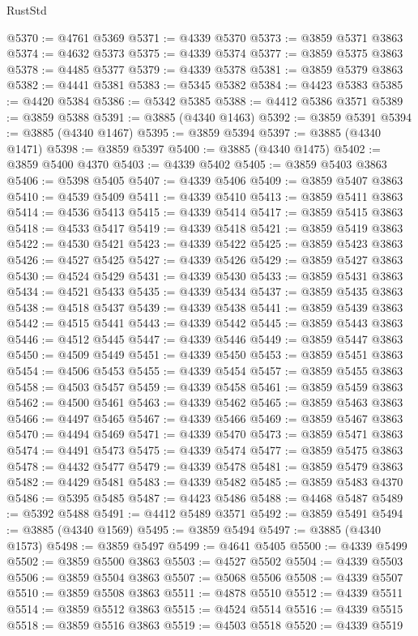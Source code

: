 \begin{lexlean}{RustStd}
\begin{coremodule}
@5370 := @4761 @5369
@5371 := @4339 @5370
@5373 := @3859 @5371 @3863
@5374 := @4632 @5373
@5375 := @4339 @5374
@5377 := @3859 @5375 @3863
@5378 := @4485 @5377
@5379 := @4339 @5378
@5381 := @3859 @5379 @3863
@5382 := @4441 @5381
@5383 := @5345 @5382
@5384 := @4423 @5383
@5385 := @4420 @5384
@5386 := @5342 @5385
@5388 := @4412 @5386 @3571
@5389 := @3859 @5388
@5391 := @3885 (@4340 @1463)
@5392 := @3859 @5391
@5394 := @3885 (@4340 @1467)
@5395 := @3859 @5394
@5397 := @3885 (@4340 @1471)
@5398 := @3859 @5397
@5400 := @3885 (@4340 @1475)
@5402 := @3859 @5400 @4370
@5403 := @4339 @5402
@5405 := @3859 @5403 @3863
@5406 := @5398 @5405
@5407 := @4339 @5406
@5409 := @3859 @5407 @3863
@5410 := @4539 @5409
@5411 := @4339 @5410
@5413 := @3859 @5411 @3863
@5414 := @4536 @5413
@5415 := @4339 @5414
@5417 := @3859 @5415 @3863
@5418 := @4533 @5417
@5419 := @4339 @5418
@5421 := @3859 @5419 @3863
@5422 := @4530 @5421
@5423 := @4339 @5422
@5425 := @3859 @5423 @3863
@5426 := @4527 @5425
@5427 := @4339 @5426
@5429 := @3859 @5427 @3863
@5430 := @4524 @5429
@5431 := @4339 @5430
@5433 := @3859 @5431 @3863
@5434 := @4521 @5433
@5435 := @4339 @5434
@5437 := @3859 @5435 @3863
@5438 := @4518 @5437
@5439 := @4339 @5438
@5441 := @3859 @5439 @3863
@5442 := @4515 @5441
@5443 := @4339 @5442
@5445 := @3859 @5443 @3863
@5446 := @4512 @5445
@5447 := @4339 @5446
@5449 := @3859 @5447 @3863
@5450 := @4509 @5449
@5451 := @4339 @5450
@5453 := @3859 @5451 @3863
@5454 := @4506 @5453
@5455 := @4339 @5454
@5457 := @3859 @5455 @3863
@5458 := @4503 @5457
@5459 := @4339 @5458
@5461 := @3859 @5459 @3863
@5462 := @4500 @5461
@5463 := @4339 @5462
@5465 := @3859 @5463 @3863
@5466 := @4497 @5465
@5467 := @4339 @5466
@5469 := @3859 @5467 @3863
@5470 := @4494 @5469
@5471 := @4339 @5470
@5473 := @3859 @5471 @3863
@5474 := @4491 @5473
@5475 := @4339 @5474
@5477 := @3859 @5475 @3863
@5478 := @4432 @5477
@5479 := @4339 @5478
@5481 := @3859 @5479 @3863
@5482 := @4429 @5481
@5483 := @4339 @5482
@5485 := @3859 @5483 @4370
@5486 := @5395 @5485
@5487 := @4423 @5486
@5488 := @4468 @5487
@5489 := @5392 @5488
@5491 := @4412 @5489 @3571
@5492 := @3859 @5491
@5494 := @3885 (@4340 @1569)
@5495 := @3859 @5494
@5497 := @3885 (@4340 @1573)
@5498 := @3859 @5497
@5499 := @4641 @5405
@5500 := @4339 @5499
@5502 := @3859 @5500 @3863
@5503 := @4527 @5502
@5504 := @4339 @5503
@5506 := @3859 @5504 @3863
@5507 := @5068 @5506
@5508 := @4339 @5507
@5510 := @3859 @5508 @3863
@5511 := @4878 @5510
@5512 := @4339 @5511
@5514 := @3859 @5512 @3863
@5515 := @4524 @5514
@5516 := @4339 @5515
@5518 := @3859 @5516 @3863
@5519 := @4503 @5518
@5520 := @4339 @5519

\end{coremodule}
\end{lexlean}
